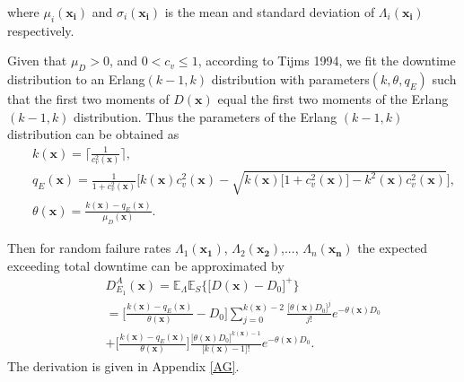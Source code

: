 \documentclass[preprint,12pt]{elsarticle}
\begin{document}
where $\mu_{i}(\boldsymbol{x_i})$ and $\sigma_{i}(\boldsymbol{x_i})$ is the mean and standard deviation of $\Lambda_{i}(\boldsymbol{x_i})$ respectively.


Given that $\mu_{D}>0$, and $0<c_{v}\leq 1$, according to Tijms 1994, we fit the downtime distribution to an Erlang$(k-1,k)$ distribution with parameters$(k,\theta,q_{E})$ such that the first two moments of $D(\boldsymbol{x})$ equal the first two moments of the Erlang $(k-1,k)$ distribution. Thus the parameters of the Erlang $(k-1,k)$ distribution can be obtained as
\begin{eqnarray}
&&k(\boldsymbol{x}) = \lceil \frac{1}{c_{v}^{2}(\boldsymbol{x})} \rceil, \label{k1}\\
&&q_{E}(\boldsymbol{x})= \frac{1}{1+c^{2}_{v}(\boldsymbol{x})}\bigg[k(\boldsymbol{x})c^{2}_{v}(\boldsymbol{x})-\sqrt{k(\boldsymbol{x})\big[1+c^{2}_{v}(\boldsymbol{x})\big]-k^{2}(\boldsymbol{x})c^{2}_{v}(\boldsymbol{x})} \bigg], \label{q1}\\
&&\theta(\boldsymbol{x}) = \frac{k(\boldsymbol{x})-q_{E}(\boldsymbol{x})}{\mu_{D}(\boldsymbol{x})}. \label{theta1}
\end{eqnarray}

 Then for random failure rates $\Lambda_{1}(\boldsymbol{x_{1}})$, $\Lambda_{2}(\boldsymbol{x_{2}})$,..., $\Lambda_{n}(\boldsymbol{x_{n}})$ the expected exceeding total downtime can be approximated by
\begin{eqnarray}
&&D_{E_{1}}^{A}(\boldsymbol{x})=\mathbb{E}_{\Lambda}\mathbb{E}_{S}\bigg\{\big[D(\boldsymbol{x})-D_{0}\big]^{+}\bigg\} \nonumber\\
&&=\bigg[\frac{k(\boldsymbol{x})-q_{E}(\boldsymbol{x})}{\theta(\boldsymbol{x})}-D_{0}\bigg]\sum_{j=0}^{k(\boldsymbol{x})-2}{\frac{\big[\theta(\boldsymbol{x}) D_{0}\big]^j}{j!}e^{-\theta(\boldsymbol{x})D_{0}}}\nonumber\\
&&+\bigg[\frac{k(\boldsymbol{x})-q_{E}(\boldsymbol{x})}{\theta(\boldsymbol{x})}\bigg]\frac{\big[\theta(\boldsymbol{x})D_{0}\big]^{k(\boldsymbol{x})-1}}{\big[k(\boldsymbol{x})-1\big]!}e^{-\theta(\boldsymbol{x})D_{0}}.
\label{EXD1}
\end{eqnarray}
The derivation is given in Appendix \ref{AG}.
\end{document}
